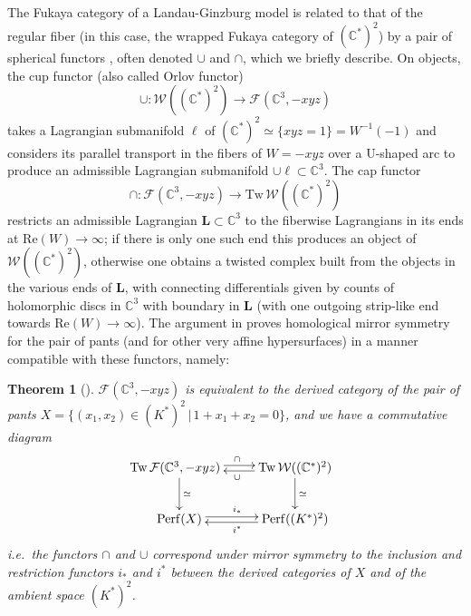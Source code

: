 \documentclass[11pt,leqno]{amsart}
\newtheorem{theo}{Theorem}[section]
\numberwithin{equation}{section}
\def\C{\mathbb{C}}
\def\Tw{\mathrm{Tw}}
\def\Re{\mathrm{Re}}
\def\F{{\mathcal F}}
\def\W{{\mathcal{W}}}
\newcommand{\Perf}{\operatorname{Perf}}
\begin{document}
The Fukaya category of a Landau-Ginzburg model is related to that of the
regular fiber (in this case, the wrapped Fukaya category of $(\C^*)^2$) 
by a pair of spherical functors \cite{AG,AS},
often denoted $\cup$ and $\cap$, which we briefly describe.
On objects, the cup functor  (also called Orlov functor)
$$\cup:\W((\C^*)^2)\to \F(\C^3,-xyz)$$
takes a Lagrangian submanifold $\ell$ of $(\C^*)^2\simeq \{xyz=1\}=W^{-1}(-1)$ and 
considers its parallel transport in the fibers of $W=-xyz$ over a U-shaped
arc to produce an admissible Lagrangian submanifold $\cup \ell\subset \C^3$.
The cap functor $$\cap:\F(\C^3,-xyz)\to \Tw\,\W((\C^*)^2)$$
restricts an admissible Lagrangian $\mathbf{L}\subset \C^3$ to the fiberwise
Lagrangians in its ends at $\Re(W)\to\infty$; if there is only one such
end this produces an object of $\W((\C^*)^2)$, otherwise one obtains a
twisted complex built from the objects in the various ends of $\mathbf{L}$, with
connecting differentials given by counts of holomorphic discs in
$\C^3$ with boundary in $\mathbf{L}$ (with one outgoing strip-like end towards
$\Re(W)\to \infty$).
The argument in \cite{AA} proves homological mirror symmetry for the pair
of pants (and for other very affine hypersurfaces) in a manner compatible with
these functors, namely:

\begin{theo}[\cite{AA}]
$\F(\C^3,-xyz)$ is equivalent to the derived category of the pair of
pants $X=\{(x_1,x_2)\in (K^*)^2\,|\,1+x_1+x_2=0\}$, and we have
a commutative diagram
$$\xymatrix{
\!\!\!\!\Tw\,\F(\C^3,-xyz) \ar@<.5ex>[r]^{\cap} \ar[d]^{\simeq} 
& \Tw\,\W((\C^*)^2) \ar@<.5ex>[l]^{\cup}\ar[d]^{\simeq} \\
\Perf(X)\ar@<.5ex>[r]^{i_*} & \Perf((K^*)^2) \ar@<.5ex>[l]^{i^*}
}
$$
i.e.\ the functors $\cap$ and $\cup$ correspond under mirror symmetry to the 
inclusion and restriction functors $i_*$ and $i^*$ between the derived categories
of $X$ and of the ambient space $(K^*)^2$.
\end{theo}
\end{document}
